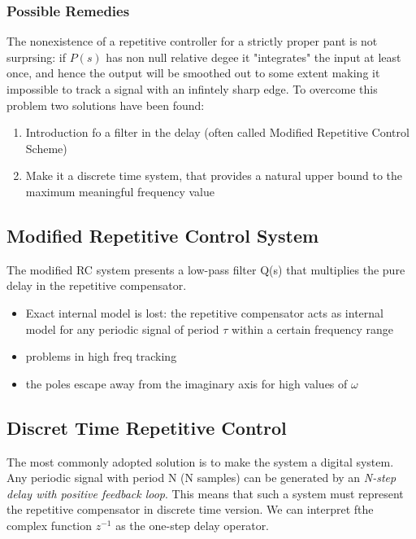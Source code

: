 \documentclass{book}
\begin{document}
\subsubsection{Possible Remedies}
The nonexistence of a repetitive controller for a strictly proper pant is not surprsing: if $P(s)$ has non null relative degee it "integrates" the input at least once, and hence the output will be smoothed out to some extent making it impossible to track a signal with an infintely sharp edge. To overcome this problem two solutions have been found:
\begin{enumerate}
    \item Introduction fo a filter in the delay (often called Modified Repetitive Control Scheme)
    \item Make it a discrete time system, that provides a natural upper bound to the maximum meaningful frequency value 
\end{enumerate}
\subsection{Modified Repetitive Control System}
The modified RC system presents a low-pass filter Q(s) that multiplies the pure delay in the repetitive compensator. 
\begin{itemize}
    \item Exact internal model is lost: the repetitive compensator acts as internal model for any periodic signal of period $\tau$ within a certain frequency range 
    \item problems in high freq tracking 
    \item the poles escape away from the imaginary axis for high values of $\omega$ 
\end{itemize}

\subsection{Discret Time Repetitive Control}
The most commonly adopted solution is to make the system a digital system. Any periodic signal with period N (N samples) can be generated by an \emph{N-step delay with positive feedback loop}. This means that such a system must represent the repetitive compensator in discrete time version. We can interpret fthe complex function $z^{-1}$ as the one-step delay operator. 
\end{document}
